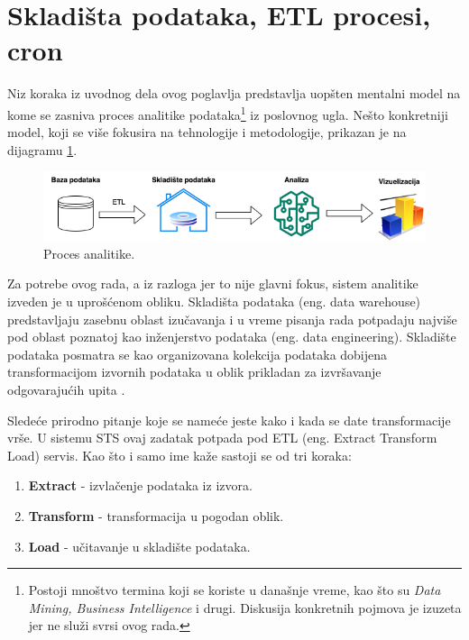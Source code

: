 \documentclass[12pt,oneside]{memoir}
\begin{document}
\section{Skladišta podataka, ETL procesi, cron}

Niz koraka iz uvodnog dela ovog poglavlja predstavlja uopšten mentalni model na kome se zasniva proces analitike podataka\footnote{Postoji mnoštvo termina koji se koriste u današnje vreme, kao što su \textit{Data Mining, Business Intelligence} i drugi. Diskusija konkretnih pojmova je izuzeta jer ne služi svrsi ovog rada.} iz poslovnog ugla. Nešto konkretniji model, koji se više fokusira na tehnologije i metodologije, prikazan je na dijagramu \ref{fig:datadiag}.

\begin{figure}[h]
  \centering
  \includegraphics[width=1\textwidth]{docs/images/ch_5/datadiag.png} 
  \caption{Proces analitike.}
  \label{fig:datadiag}
\end{figure}

Za potrebe ovog rada, a iz razloga jer to nije glavni fokus, sistem analitike izveden je u uprošćenom obliku. Skladišta podataka (eng. data warehouse) predstavljaju zasebnu oblast izučavanja i u vreme pisanja rada potpadaju najviše pod oblast poznatoj kao inženjerstvo podataka (eng. data engineering). Skladište podataka posmatra se kao organizovana kolekcija podataka dobijena transformacijom izvornih podataka u oblik prikladan za izvršavanje odgovarajućih upita \cite{dataanalytics}.

Sledeće prirodno pitanje koje se nameće jeste kako i kada se date transformacije vrše. U sistemu STS ovaj zadatak potpada pod ETL (eng. Extract Transform Load) servis. Kao što i samo ime kaže sastoji se od tri koraka:
\begin{enumerate}
    \item \textbf{Extract} - izvlačenje podataka iz izvora.
    \item \textbf{Transform} - transformacija u pogodan oblik.
    \item \textbf{Load} - učitavanje u skladište podataka.
\end{enumerate}
\end{document}
